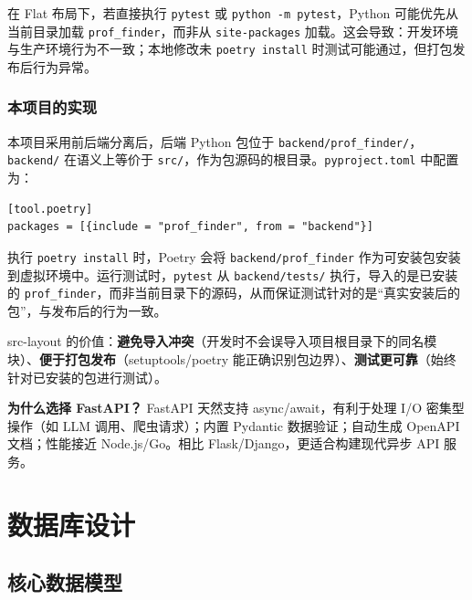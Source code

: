 \documentclass[11pt]{article}
\begin{document}
在 Flat 布局下，若直接执行 \texttt{pytest} 或 \texttt{python -m pytest}，Python 可能优先从当前目录加载 \texttt{prof\_finder}，而非从 \texttt{site-packages} 加载。这会导致：开发环境与生产环境行为不一致；本地修改未 \texttt{poetry install} 时测试可能通过，但打包发布后行为异常。

\subsubsection{本项目的实现}

本项目采用前后端分离后，后端 Python 包位于 \texttt{backend/prof\_finder/}，\texttt{backend/} 在语义上等价于 \texttt{src/}，作为包源码的根目录。\texttt{pyproject.toml} 中配置为：

\begin{lstlisting}[caption=pyproject.toml 中的包声明]
[tool.poetry]
packages = [{include = "prof_finder", from = "backend"}]
\end{lstlisting}

执行 \texttt{poetry install} 时，Poetry 会将 \texttt{backend/prof\_finder} 作为可安装包安装到虚拟环境中。运行测试时，\texttt{pytest} 从 \texttt{backend/tests/} 执行，导入的是已安装的 \texttt{prof\_finder}，而非当前目录下的源码，从而保证测试针对的是“真实安装后的包”，与发布后的行为一致。

\begin{keypoint}
src-layout 的价值：\textbf{避免导入冲突}（开发时不会误导入项目根目录下的同名模块）、\textbf{便于打包发布}（setuptools/poetry 能正确识别包边界）、\textbf{测试更可靠}（始终针对已安装的包进行测试）。
\end{keypoint}

\begin{thinkquestion}
\textbf{为什么选择 FastAPI？} FastAPI 天然支持 async/await，有利于处理 I/O 密集型操作（如 LLM 调用、爬虫请求）；内置 Pydantic 数据验证；自动生成 OpenAPI 文档；性能接近 Node.js/Go。相比 Flask/Django，更适合构建现代异步 API 服务。
\end{thinkquestion}

\section{数据库设计}

\subsection{核心数据模型}
\end{document}
